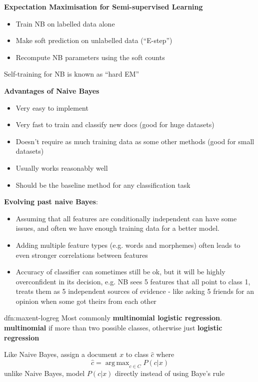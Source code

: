 \documentclass[landscape, 8pt]{extarticle}
\DeclareMathOperator*{\argmax}{arg\,max}
\begin{document}
\begin{multicols}{3}
\textbf{Expectation Maximisation for Semi-supervised Learning}

\begin{itemize}
    \setlength\itemsep{0em}
    \item Train NB on labelled data alone
    \item Make soft prediction on unlabelled data (``E-step'')
    \item Recompute NB parameters using the soft counts
\end{itemize}

Self-training for NB is known as ``hard EM''

\textbf{Advantages of Naive Bayes}
\begin{itemize}
    \setlength\itemsep{0em}
    \item Very easy to implement
    \item Very fast to train and classify new docs (good for huge datasets)
    \item Doesn't require as much training data as some other methods (good for small datasets)
    \item Usually works reasonably well
    \item Should be the baseline method for any classification task
\end{itemize}

\textbf{Evolving past naive Bayes}: 
\begin{itemize}
    \setlength\itemsep{0em}
    \item Assuming that all features are conditionally independent can have some issues, and often we have enough training data for a better model.
    \item Adding multiple feature types (e.g. words and morphemes) often leads to even stronger correlations between features
    \item Accuracy of classifier can sometimes still be ok, but it will be highly overconfident in its decision, e.g. NB sees 5 features that all point to class 1, treats them as 5 independent sources of evidence - like asking 5 friends for an opinion when some got theirs from each other
\end{itemize}

\begin{dfn}{dfn:maxent-logreg}{}
    Most commonly \textbf{multinomial logistic regression}. \textbf{multinomial} if more than two possible classes, otherwise just \textbf{logistic regression}

    Like Naive Bayes, assign a document $x$ to class $\hat{c}$ where
    \[\hat{c} = \argmax_{c\in C} P(c |x)\]
    unlike Naive Bayes, model $P(c|x)$ directly instead of using Baye's rule


\end{dfn}
\end{multicols}
\end{document}
